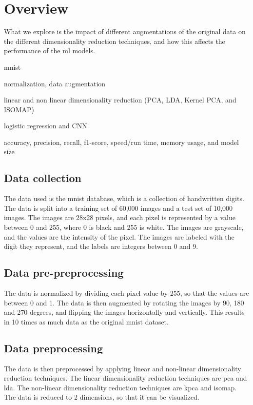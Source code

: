 \section{Overview}\label{sec:overview}
What we explore is the impact of different augmentations of the original data on the different dimensionality reduction techniques, and how this affects the performance of the \gls{ml} models.


\begin{description}
    \setlength\itemsep{0em}
    \item[dataset] mnist
    \item[pre-preprocessing] normalization, data augmentation
    \item[preprocessing] linear and non linear dimensionality reduction (PCA, LDA, Kernel PCA, and ISOMAP)
    \item[models] logistic regression and CNN
    \item[evaluation] accuracy, precision, recall, f1-score, speed/run time, memory usage, and model size
\end{description}


\subsection{Data collection}\label{subsec:data-collection}
The data used is the \gls{mnist} database, which is a collection of handwritten digits. The data is split into a training set of 60,000 images and a test set of 10,000 images. The images are 28x28 pixels, and each pixel is represented by a value between 0 and 255, where 0 is black and 255 is white. The images are grayscale, and the values are the intensity of the pixel. The images are labeled with the digit they represent, and the labels are integers between 0 and 9.

\subsection{Data pre-preprocessing}\label{subsec:data-pre-preprocessing}
The data is normalized by dividing each pixel value by 255, so that the values are between 0 and 1. The data is then augmented by rotating the images by 90, 180 and 270 degrees, and flipping the images horizontally and vertically. This results in 10 times as much data as the original \gls{mnist} dataset.

\subsection{Data preprocessing}\label{subsec:data-preprocessing}
The data is then preprocessed by applying linear and non-linear dimensionality reduction techniques. The linear dimensionality reduction techniques are \gls{pca} and \gls{lda}. The non-linear dimensionality reduction techniques are \gls{kpca} and \gls{isomap}. The data is reduced to 2 dimensions, so that it can be visualized.

